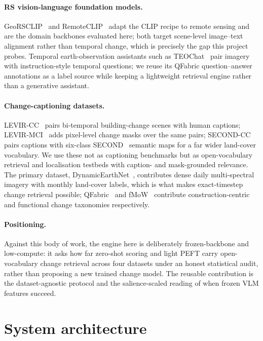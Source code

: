 \documentclass{article}
\begin{document}
\paragraph{RS vision-language foundation models.}
GeoRSCLIP~\cite{georsclip} and RemoteCLIP~\cite{remoteclip} adapt the CLIP recipe
to remote sensing and are the domain backbones evaluated here; both target
scene-level image--text alignment rather than temporal change, which is precisely
the gap this project probes. Temporal earth-observation assistants such as
TEOChat~\cite{teochat} pair imagery with instruction-style temporal questions; we
reuse its QFabric question--answer annotations as a label source while keeping a
lightweight retrieval engine rather than a generative assistant.

\paragraph{Change-captioning datasets.}
LEVIR-CC~\cite{levircc} pairs bi-temporal building-change scenes with human
captions; LEVIR-MCI~\cite{levirmci} adds pixel-level change masks over the same
pairs; SECOND-CC~\cite{secondcc} pairs captions with six-class
SECOND~\cite{second} semantic maps for a far wider land-cover vocabulary. We use
these not as captioning benchmarks but as open-vocabulary retrieval and
localisation testbeds with caption- and mask-grounded relevance. The primary
dataset, DynamicEarthNet~\cite{dynamicearthnet}, contributes dense daily
multi-spectral imagery with monthly land-cover labels, which is what makes
exact-timestep change retrieval possible; QFabric~\cite{qfabric} and
fMoW~\cite{fmow} contribute construction-centric and functional change taxonomies
respectively.

\paragraph{Positioning.}
Against this body of work, the engine here is deliberately frozen-backbone and
low-compute: it asks how far zero-shot scoring and light PEFT carry
open-vocabulary change retrieval across four datasets under an honest statistical
audit, rather than proposing a new trained change model. The reusable
contribution is the dataset-agnostic protocol and the salience-scaled reading of
when frozen VLM features succeed.


\section{System architecture}
\label{sec:arch}
\end{document}
